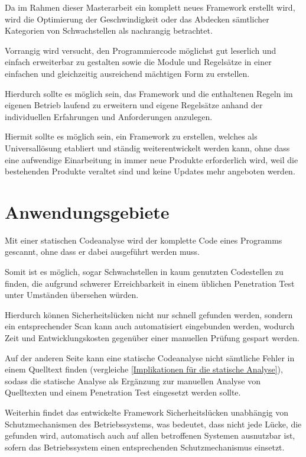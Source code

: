         Da im Rahmen dieser Masterarbeit ein komplett neues Framework erstellt wird,
        wird die Optimierung der Geschwindigkeit oder
        das Abdecken sämtlicher Kategorien von Schwachstellen als nachrangig betrachtet.

        Vorrangig wird versucht,
        den Programmiercode möglichst gut leserlich und
        einfach erweiterbar zu gestalten sowie
        die Module und
        Regelsätze in einer einfachen und
        gleichzeitig ausreichend mächtigen Form zu erstellen.

        Hierdurch sollte es möglich sein,
        das Framework und
        die enthaltenen Regeln im eigenen Betrieb laufend zu erweitern und
        eigene Regelsätze anhand der individuellen Erfahrungen und
        Anforderungen anzulegen.

        Hiermit sollte es möglich sein,
        ein Framework zu erstellen,
        welches als Universallösung etabliert und
        ständig weiterentwickelt werden kann,
        ohne dass eine aufwendige Einarbeitung in immer neue Produkte erforderlich wird,
        weil die bestehenden Produkte veraltet sind und
        keine Updates mehr angeboten werden.

    \section{Anwendungsgebiete}\label{Anwendungsgebiete}
        Mit einer statischen Codeanalyse wird der komplette Code eines Programms gescannt,
        ohne dass er dabei ausgeführt werden muss.

        Somit ist es möglich,
        sogar Schwachstellen in kaum genutzten Codestellen zu finden,
        die aufgrund schwerer Erreichbarkeit in einem üblichen Penetration Test unter Umständen übersehen würden.

        Hierdurch können Sicherheitslücken nicht nur schnell gefunden werden,
        sondern ein entsprechender Scan kann auch automatisiert eingebunden werden,
        wodurch Zeit und
        Entwicklungskosten gegenüber einer manuellen Prüfung gespart werden.

        Auf der anderen Seite kann eine statische Codeanalyse nicht sämtliche Fehler in einem Quelltext finden
        (vergleiche
        \vref{Implikationen für die statische Analyse}),
        sodass die statische Analyse als Ergänzung zur manuellen Analyse von Quelltexten und
        einem Penetration Test eingesetzt werden sollte.

        Weiterhin findet das entwickelte Framework Sicherheitslücken unabhängig von Schutzmechanismen des Betriebssystems,
        was bedeutet,
        dass nicht jede Lücke,
        die gefunden wird,
        automatisch auch auf allen betroffenen Systemen ausnutzbar ist,
        sofern das Betriebssystem einen entsprechenden Schutzmechanismus einsetzt.

